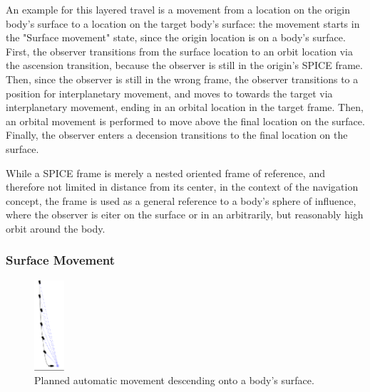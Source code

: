 An example for this layered travel is a movement from a location on the origin body's surface to a location on the
target body's surface:
the movement starts in the "Surface movement" state, since the origin location is on a body's surface.
First, the observer transitions from the surface location to an orbit location via the ascension transition, because
the observer is still in the origin's SPICE frame.
Then, since the observer is still in the wrong frame, the observer transitions to a position for interplanetary
movement, and moves to towards the target via interplanetary movement, ending in an orbital location in the target
frame.
Then, an orbital movement is performed to move above the final location on the surface.
Finally, the observer enters a decension transitions to the final location on the surface.

While a SPICE frame is merely a nested oriented frame of reference, and therefore not limited in distance from its
center, in the context of the navigation concept, the frame is used as a general reference to a body's sphere of
influence, where the observer is eiter on the surface or in an arbitrarily, but reasonably high orbit around the body.

\subsubsection{Surface Movement}\label{subsubsec:surface-movements}

\begin{figure}
    \centering
    \includegraphics[width=0.1\textwidth]{content/4_3_autoNavigation/img/PlannedLanding}
    \caption{Planned automatic movement descending onto a body's surface.}
    \label{fig:new-auto-nav-descend}
\end{figure}

